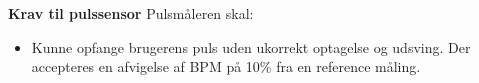 \textbf{Krav til pulssensor} \newline
Pulsmåleren skal:
\begin{itemize}
\item Kunne opfange brugerens puls uden ukorrekt optagelse og udsving. Der accepteres en afvigelse af BPM på 10\% fra en reference måling.
\end{itemize}
%

